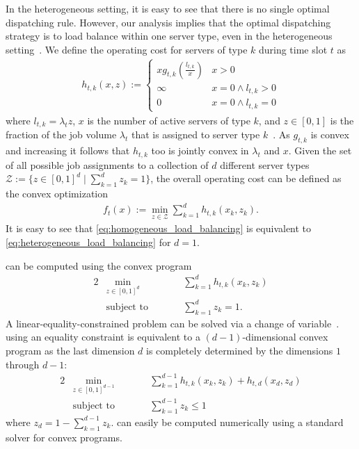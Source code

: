 In the heterogeneous setting, it is easy to see that there is no single optimal dispatching rule. However, our analysis implies that the optimal dispatching strategy is to load balance within one server type, even in the heterogeneous setting~\cite{Albers2021_2}. We define the operating cost for servers of type $k$ during time slot $t$ as \begin{align}\label{eq:heterogeneous_load_balancing_unit}
    h_{t,k}(x,z) := \begin{cases}
        x g_{t,k}\left(\frac{l_{t,k}}{x}\right) & x > 0 \\
        \infty                                  & x = 0 \land l_{t,k} > 0 \\
        0                                       & x = 0 \land l_{t,k} = 0
    \end{cases}
\end{align} where $l_{t,k} = \lambda_t z$, $x$ is the number of active servers of type $k$, and $z \in [0,1]$ is the fraction of the job volume $\lambda_t$ that is assigned to server type $k$~\cite{Albers2021_2}. As $g_{t,k}$ is convex and increasing it follows that $h_{t,k}$ too is jointly convex in $\lambda_t$ and $x$. Given the set of all possible job assignments to a collection of $d$ different server types $\mathcal{Z} := \{z \in [0,1]^d \mid \sum_{k=1}^d z_k = 1\}$, the overall operating cost can be defined as the convex optimization \begin{align}\label{eq:heterogeneous_load_balancing}
    f_t(x) := \min_{z \in \mathcal{Z}} \sum_{k=1}^d h_{t,k}(x_k,z_k).
\end{align} It is easy to see that \cref{eq:homogeneous_load_balancing} is equivalent to \cref{eq:heterogeneous_load_balancing} for $d = 1$.

 can be computed using the convex program \begin{alignat}{2}\label{eq:heterogeneous_load_balancing_constrained_convex_program}
    &\min_{z \in [0,1]^d} &\qquad&\sum_{k=1}^d h_{t,k}(x_k,z_k) \\
    &\textrm{subject to}  &      &\sum_{k=1}^d z_k = 1.
\end{alignat} A linear-equality-constrained problem can be solved via a change of variable~\cite{Singer2016}.  using an equality constraint is equivalent to a $(d-1)$-dimensional convex program as the last dimension $d$ is completely determined by the dimensions $1$ through $d-1$: \begin{alignat}{2}\label{eq:heterogeneous_load_balancing_convex_program}
    &\min_{z \in [0,1]^{d-1}} &\qquad&\sum_{k=1}^{d-1} h_{t,k}(x_k,z_k) + h_{t,d}(x_d,z_d) \\
    &\textrm{subject to}  &      &\sum_{k=1}^{d-1} z_k \leq 1 \nonumber
\end{alignat} where $z_d = 1 - \sum_{k=1}^{d-1} z_k$.  can easily be computed numerically using a standard solver for convex programs.

